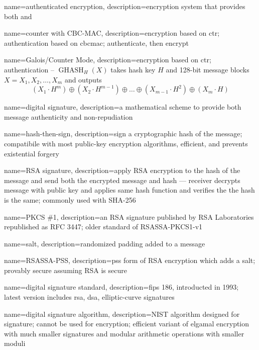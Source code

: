 {
    name={authenticated encryption},
    description={encryption system that provides both  and }
}

{
    name={counter with CBC-MAC},
    description={encryption based on \acrfull{ctr}; authentication based on \gls{cbcmac}; authenticate, then encrypt}
}

{
    name={Galois/Counter Mode},
    description={encryption based on \acrfull{ctr}; authentication -- $\operatorname{GHASH}_H(X)$ takes hash key $H$ and 128-bit message blocks $X = X_1, X_2, \dots, X_m$ and outputs \[(X_1\cdot H^m)\oplus(X_2\cdot H^{m-1})\oplus\dots\oplus(X_{m-1}\cdot H^2)\oplus(X_m\cdot H)\]}
}

{
    name={digital signature},
    description={a mathematical scheme to provide both message \gls{authenticity} and \gls{non-repudiation}}
}

{
    name={hash-then-sign},
    description={sign a cryptographic hash of the message; compatibile with most public-key encryption algorithms, efficient, and prevents existential forgery}
}

{
    name={RSA signature},
    description={apply RSA encryption to the hash of the message and send both the encrypted message and hash --- receiver decrypts message with public key and applies same hash function and verifies the the hash is the same; commonly used with SHA-256}
}

{
    name={PKCS \#1},
    description={an RSA signature published by RSA Laboratories republished as RFC 3447; older standard of RSASSA-PKCS1-v1}
}

{
    name={salt},
    description={randomized padding added to a message}
}

{
    name={RSASSA-PSS},
    description={\acrfull{pss} form of RSA encryption which adds a \gls{salt}; provably secure assuming RSA is secure}
}

{
    name={digital signature standard},
    description={\acrfull{fips} 186, introducted in 1993; latest version includes \acrshort{rsa}, \acrshort{dsa}, elliptic-curve signatures}
}

{
    name={digital signature algorithm},
    description={NIST algorithm designed for signature; cannot be used for encryption; efficient variant of \gls{elgamal encryption} with much smaller signatures and modular arithmetic operations with smaller moduli}
}

